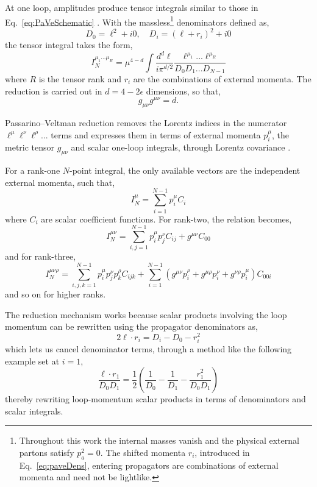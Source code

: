 At one loop, amplitudes produce tensor integrals similar
to those in Eq.~\eqref{eq:PaVeSchematic} \cite{Passarino:1979pv}. With the massless\footnote{
Throughout this work the internal masses vanish and the physical external
partons satisfy $p_a^2=0$. The shifted momenta $r_i$, introduced in Eq.~\eqref{eq:paveDens},
entering propagators are combinations of external momenta and need not be lightlike.}
denominators defined as,
\begin{equation}\label{eq:paveDens}
    D_0 = \ell^2+i0,\quad D_i = (\ell + r_i)^2 + i0
\end{equation}
the tensor integral takes the form,
\begin{equation}
    I_N^{\mu_1...\mu_R} = \mu^{4-d}\int\frac{d^d\ell}{i\pi^{d/2}}\frac{\ell^{\mu_1}...\ell^{\mu_R}}{D_0D_1...D_{N-1}}
\end{equation}
where $R$ is the tensor rank and $r_i$ are the combinations of 
external momenta. 
The reduction is carried out in $d=4-2\epsilon$ dimensions, so that,
\begin{equation}
    g_{\mu\nu}g^{\mu\nu} = d.
\end{equation}

Passarino--Veltman reduction removes the Lorentz indices in the numerator 
$\ell^\mu\ell^\nu\ell^\rho...$ terms and expresses them 
in terms of external momenta $p_i^\mu$, the metric 
tensor $g_{\mu\nu}$ and scalar one-loop integrals, through 
Lorentz covariance \cite{Passarino:1979pv}.

For a rank-one $N$-point integral, the only available 
vectors are the independent external momenta, such that,
\begin{equation}\label{eq:paveRankOne}
    I_N^\mu = \sum_{i=1}^{N-1}p_i^\mu C_i
\end{equation}
where $C_i$ are scalar coefficient functions.
For rank-two, the relation becomes,
\begin{equation}
    I_N^{\mu\nu} = \sum_{i,j=1}^{N-1}p_i^\mu p_j^\nu C_{ij} + g^{\mu\nu}C_{00}
\end{equation}
and for rank-three,
\begin{equation}
    I_N^{\mu\nu\rho} = \sum_{i,j,k=1}^{N-1}p_i^\mu p_j^\nu p_k^\rho C_{ijk} + \sum_{i=1}^{N-1} \left(g^{\mu\nu}p_i^\rho + g^{\mu\rho}p_i^\nu + g^{\nu\rho}p_i^\mu\right)C_{00i}
\end{equation}
and so on for higher ranks.

The reduction mechanism works because scalar products 
involving the loop momentum can be rewritten using the
propagator denominators as,
\begin{equation}\label{eq:ellToDens}
    2\ell\cdot r_i = D_i - D_0 - r_i^2
\end{equation}
which lets us cancel denominator terms, through a method 
like the following example set at $i=1$,
\begin{equation}
    \frac{\ell\cdot r_1}{D_0D_1} = \frac12\left(\frac{1}{D_0}-\frac1{D_1}-\frac{r_1^2}{D_0D_1}\right)
\end{equation}
thereby rewriting loop-momentum scalar products in terms of denominators and 
scalar integrals.

